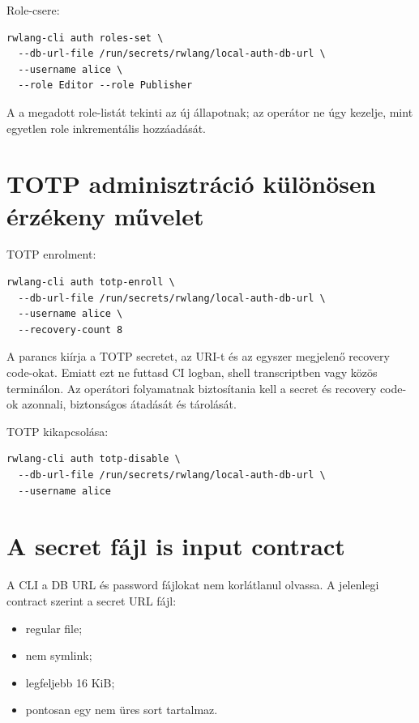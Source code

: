 Role-csere:

\begin{lstlisting}
rwlang-cli auth roles-set \
  --db-url-file /run/secrets/rwlang/local-auth-db-url \
  --username alice \
  --role Editor --role Publisher
\end{lstlisting}

A  a megadott role-listát tekinti az új állapotnak; az operátor ne úgy kezelje, mint egyetlen role inkrementális hozzáadását.

\section{TOTP adminisztráció különösen érzékeny művelet}

TOTP enrolment:

\begin{lstlisting}
rwlang-cli auth totp-enroll \
  --db-url-file /run/secrets/rwlang/local-auth-db-url \
  --username alice \
  --recovery-count 8
\end{lstlisting}

A parancs kiírja a TOTP secretet, az  URI-t és az egyszer megjelenő recovery code-okat. Emiatt ezt ne futtasd CI logban, shell transcriptben vagy közös terminálon. Az operátori folyamatnak biztosítania kell a secret és recovery code-ok azonnali, biztonságos átadását és tárolását.

TOTP kikapcsolása:

\begin{lstlisting}
rwlang-cli auth totp-disable \
  --db-url-file /run/secrets/rwlang/local-auth-db-url \
  --username alice
\end{lstlisting}

\section{A secret fájl is input contract}

A CLI a DB URL és password fájlokat nem korlátlanul olvassa. A jelenlegi contract szerint a secret URL fájl:

\begin{itemize}
  \item regular file;
  \item nem symlink;
  \item legfeljebb 16 KiB;
  \item pontosan egy nem üres sort tartalmaz.
\end{itemize}

